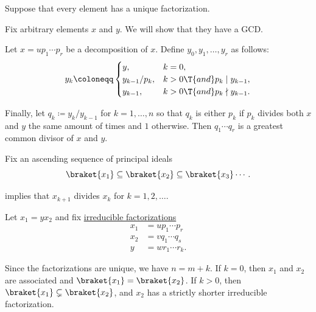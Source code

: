 \begin{defproof}
   Suppose that every element has a unique factorization.

   Fix arbitrary elements \( x \) and \( y \). We will show that they have a GCD.

  Let \( x = u p_1 \cdots p_r \) be a decomposition of \( x \). Define \( y_0, y_1, \ldots, y_r \) as follows:
  \begin{equation*}
    y_k \coloneqq \begin{cases}
      y,             &k = 0, \\
      y_{k-1} / p_k, &k > 0 \T{and} p_k \mid y_{k-1}, \\
      y_{k-1},       &k > 0 \T{and} p_k \nmid y_{k-1}.
    \end{cases}
  \end{equation*}

  Finally, let \( q_k \coloneqq y_k / y_{k-1} \) for \( k = 1, \ldots, n \) so that \( q_k \) is either \( p_k \) if \( p_k \) divides both \( x \) and \( y \) the same amount of times and \( 1 \) otherwise. Then \( q_1 \cdots q_r \) is a greatest common divisor of \( x \) and \( y \).

   Fix an ascending sequence of principal ideals
  \begin{equation*}
    \braket{ x_1 } \subseteq \braket{ x_2 } \subseteq \braket{ x_3 } \cdots.
  \end{equation*}

   implies that \( x_{k+1} \) divides \( x_k \) for \( k = 1, 2, \ldots \).

  Let \( x_1 = y x_2 \) and fix \hyperref[def:irreducible_factorization]{irreducible factorizations}
  \begin{align*}
    x_1 &= u p_1 \cdots p_r \\
    x_2 &= v q_1 \cdots q_s \\
    y   &= w r_1 \cdots r_k.
  \end{align*}

  Since the factorizations are unique, we have \( n = m + k \). If \( k = 0 \), then \( x_1 \) and \( x_2 \) are associated and \( \braket{ x_1 } = \braket{ x_2 } \). If \( k > 0 \), then \( \braket{ x_1 } \subsetneq \braket{ x_2 } \), and \( x_2 \) has a strictly shorter irreducible factorization.


\end{defproof}
